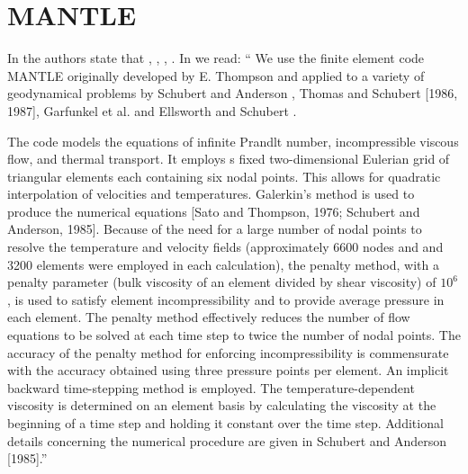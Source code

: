 \section{MANTLE}

In \cite{scag95} the authors state that 
\cite{scan85}, \cite{elsc88}, \cite{scoa89}, 
\cite{olsa88} \cite{olsa93}.
In \cite{olsa88} we read: ``
We use the finite element code MANTLE originally
developed by E. Thompson \cite{thll69,thha73,thom75,dath78}
and applied to a variety
of geodynamical problems by Schubert and Anderson \cite{scan85},
Thomas and Schubert [1986, 1987],
Garfunkel et al. \cite{gaas86} and Ellsworth and Schubert \cite{elsc88}.

The code models
the equations of infinite Prandlt number, incompressible
viscous flow, and thermal transport.
It employs s fixed two-dimensional Eulerian grid
of triangular elements each containing six nodal points.
This allows for quadratic interpolation
of velocities and temperatures.
Galerkin's method is used to produce the numerical
equations [Sato and Thompson, 1976; Schubert and Anderson, 1985].
Because of the need for a large number of nodal points to resolve the 
temperature and velocity fields (approximately 6600 nodes
and and 3200 elements were employed in each
calculation), the penalty method, with a penalty
parameter (bulk viscosity of an element divided
by shear viscosity) of $10^6$, is used to satisfy
element incompressibility and to provide
average pressure in each element.
The penalty method effectively reduces the number of flow
equations to be solved at each time step to twice the number of nodal points.
The accuracy of the penalty method for enforcing incompressibility
is commensurate with the accuracy obtained using three pressure points per
element. An implicit backward time-stepping method is employed.
The temperature-dependent viscosity is determined on an element basis by
calculating the viscosity at the beginning of a time step and holding 
it constant over the time step. Additional details concerning the numerical 
procedure are given in Schubert and Anderson [1985].''

